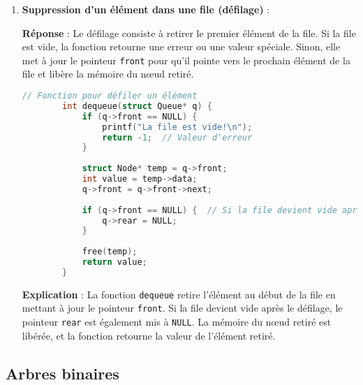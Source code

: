 \begin{enumerate}
	\item \textbf{Suppression d'un élément dans une file (défilage)} :
	
	\textbf{Réponse} :
	Le défilage consiste à retirer le premier élément de la file. Si la file est vide, la fonction retourne une erreur ou une valeur spéciale. Sinon, elle met à jour le pointeur \texttt{front} pour qu'il pointe vers le prochain élément de la file et libère la mémoire du nœud retiré.
	
	\begin{lstlisting}[language=C]
		// Fonction pour défiler un élément
		int dequeue(struct Queue* q) {
			if (q->front == NULL) {
				printf("La file est vide!\n");
				return -1;  // Valeur d'erreur
			}
			
			struct Node* temp = q->front;
			int value = temp->data;
			q->front = q->front->next;
			
			if (q->front == NULL) {  // Si la file devient vide après le défilage
				q->rear = NULL;
			}
			
			free(temp);
			return value;
		}
	\end{lstlisting}
	
	\textbf{Explication} :
	La fonction \texttt{dequeue} retire l'élément au début de la file en mettant à jour le pointeur \texttt{front}. Si la file devient vide après le défilage, le pointeur \texttt{rear} est également mis à \texttt{NULL}. La mémoire du nœud retiré est libérée, et la fonction retourne la valeur de l'élément retiré.
	
\end{enumerate}

%

\subsection{Arbres binaires}

